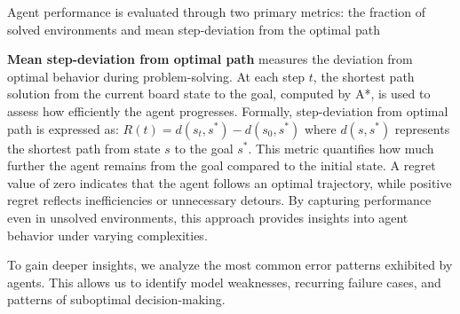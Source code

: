 Agent performance is evaluated through two primary metrics: the fraction of solved environments and mean step-deviation from the optimal path 

\textbf{Mean step-deviation from optimal path} measures the deviation from optimal behavior during problem-solving. At each step \( t \), the shortest path solution from the current board state to the goal, computed by A*, is used to assess how efficiently the agent progresses. Formally, step-deviation from optimal path is expressed as:  $R(t) = d(s_t, s^*) - d(s_0, s^*)$ where \( d(s, s^*) \) represents the shortest path from state \( s \) to the goal \( s^* \). This metric quantifies how much further the agent remains from the goal compared to the initial state. A regret value of zero indicates that the agent follows an optimal trajectory, while positive regret reflects inefficiencies or unnecessary detours. By capturing performance even in unsolved environments, this approach provides insights into agent behavior under varying complexities.

To gain deeper insights, we analyze the most common error patterns exhibited by agents. This allows us to identify model weaknesses, recurring failure cases, and patterns of suboptimal decision-making.

